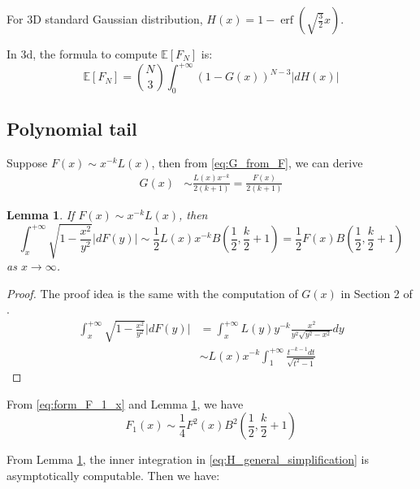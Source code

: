 \documentclass{article}
\newtheorem{lemma}{Lemma}
\def\E{\mathbb{E}}
\DeclareMathOperator{\erf}{erf}
\begin{document}
For 3D standard Gaussian distribution, $H(x) = 1-\erf(\sqrt{\frac{3}{2}}x)$.

In 3d, the formula to compute $\E[F_N]$ is:
\begin{equation}\label{eq:F_N_H_G_d_3}
    \E[F_N] = \binom{N}{3}\int_0^{+\infty}(1-G(x))^{N-3}|dH(x)|   
\end{equation}
\subsection{Polynomial tail}
Suppose $F(x) \sim x^{-k} L(x)$, then from
\eqref{eq:G_from_F},
we can derive
\begin{align}
    G(x) & \sim \frac{L(x)x^{-k}}{2(k+1)} 
    = \frac{F(x)}{2(k+1)}
\end{align}
\begin{lemma}\label{lem:F_x_sqrt_11}
    If $F(x) \sim x^{-k} L(x)$, then
    \begin{equation}
        \int_x^{+\infty} \sqrt{1-\frac{x^2}{y^2}}
        |d F(y)| \sim \frac{1}{2} L(x) x^{-k} B\left(\frac{1}{2}, \frac{k}{2}+1
        \right)
        = \frac{1}{2} F(x) B\left(\frac{1}{2}, \frac{k}{2}+1
        \right)
    \end{equation}
    as $x\to \infty$.
\end{lemma}
\begin{proof}
    The proof idea is the same with the computation
    of $G(x)$ in Section 2 of \cite{carnal1970konvexe}.
\begin{align*}
    \int_x^{+\infty} \sqrt{1-\frac{x^2}{y^2}}
        |d F(y)| &=\int_x^{+\infty} L(y)y^{-k} \frac{x^2}{y^2\sqrt{y^2-x^2}} dy \\
&\sim L(x)x^{-k}\int_1^{+\infty} \frac{t^{-k-1}dt}{\sqrt{t^2-1}}
\end{align*}
\end{proof}
From \eqref{eq:form_F_1_x} and Lemma \ref{lem:F_x_sqrt_11}, we have
\begin{equation}\label{eq:F_1_formula_1_4}
    F_1(x) \sim \frac{1}{4} F^2(x) B^2\left(\frac{1}{2}, \frac{k}{2}+1
    \right)
\end{equation}



From Lemma \ref{lem:F_x_sqrt_11},
the inner integration in \eqref{eq:H_general_simplification} is asymptotically
computable. Then we have:
\end{document}
